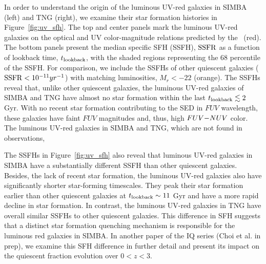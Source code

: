 In order to understand the origin of the luminous UV-red galaxies in SIMBA
(left) and TNG (right), we examine their star formation histories in
Figure~\ref{fig:uv_sfh}.
The top and center panels mark the luminous UV-red galaxies on the optical
and UV color-magnitude relations predicted by the \eda~(red). 
The bottom panels present the median specific SFH (SSFH), ${\rm SSFR}$ as a
function of lookback time, $t_{\rm lookback}$, with the shaded regions
representing the 68 percentile of the SSFH.
For comparison, we include the SSFHs of other quiescent galaxies 
(${\rm SSFR} < 10^{-11}yr^{-1}$) with matching luminosities, $M_r < -22$ (orange).
The SSFHs reveal that, unlike other quiescent galaxies, the luminous UV-red
galaxies of SIMBA and TNG have  almost no star formation within the last $t_{\rm lookback} \lesssim 2$ Gyr.
With no recent star formation contributing to the SED in $FUV$ wavelength,
these galaxies have faint $FUV$ magnitudes and, thus, high $FUV{-}NUV$ color.  
The luminous UV-red galaxies in SIMBA and TNG, which are not found in
observations, 

The SSFHs in Figure~\ref{fig:uv_sfh} also reveal that luminous UV-red
galaxies in SIMBA have a substantially different SSFH than other quiescent
galaxies. 
Besides, the lack of recent star formation, the luminous UV-red galaxies also
have significantly shorter star-forming timescales. 
They peak their star formation earlier than other quiescent galaxies at
$t_{\rm lookback}\sim 11$ Gyr and have a more rapid decline in star
formation. 
In contrast, the luminous UV-red galaxies in TNG have overall similar
SSFHs to other quiescent galaxies. 
This difference in SFH suggests that a distinct star formation quenching
mechanism is responsible for the luminous red galaxies in SIMBA. 
In another paper of the IQ series (Choi et al. in prep), we examine this
SFH difference in further detail and present its impact on the quiescent 
fraction evolution over $0 < z < 3$. 


